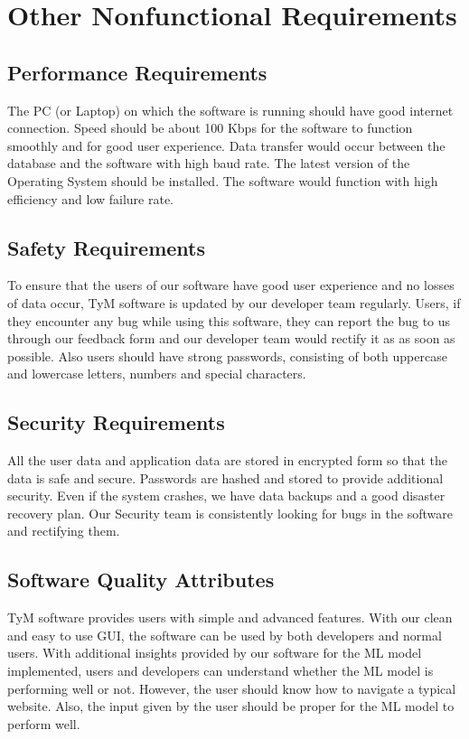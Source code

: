 \documentclass{scrreprt}
\begin{document}
\chapter{Other Nonfunctional Requirements}

\section{Performance Requirements}
The PC (or Laptop) on which the software is running should have good internet connection. Speed should be about 100 Kbps for the software to function smoothly and for good user experience. Data transfer would occur between the database and the software with high baud rate. The latest version of the Operating System should be installed. The software would function with high efficiency and low failure rate.

\section{Safety Requirements}
To ensure that the users of our software have good user experience and no losses of data occur, TyM software is updated by our developer team regularly. Users, if they encounter any bug while using this software, they can report the bug to us through our feedback form and our developer team would rectify it as as soon as possible. Also users should have strong passwords, consisting of both uppercase and lowercase letters, numbers and special characters. 

\section{Security Requirements}
All the user data and application data are stored in encrypted form so that the data is safe and secure. Passwords are hashed and stored to provide additional security. Even if the system crashes, we have data backups and a good disaster recovery plan. Our Security team is consistently looking for bugs in the software and rectifying them.

\section{Software Quality Attributes}
TyM software provides users with simple and advanced features. With our clean and easy to use GUI, the software can be used by both developers and normal users. With additional insights provided by our software for the ML model implemented, users and developers can understand whether the ML model is performing well or not. However, the user should know how to navigate a typical website. Also, the input given by the user should be proper for the ML model to perform well.
\end{document}
